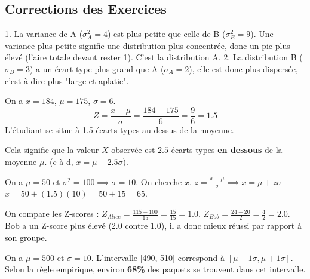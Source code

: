 
\subsection{Corrections des Exercices}

\begin{correctionbox}
1.  La variance de A ($\sigma_A^2=4$) est plus petite que celle de B ($\sigma_B^2=9$). Une variance plus petite signifie une distribution plus concentrée, donc un pic plus élevé (l'aire totale devant rester 1). C'est la distribution A.
2.  La distribution B ($\sigma_B=3$) a un écart-type plus grand que A ($\sigma_A=2$), elle est donc plus dispersée, c'est-à-dire plus "large et aplatie".
\end{correctionbox}

\begin{correctionbox}
On a $x=184$, $\mu=175$, $\sigma=6$.
$$Z = \frac{x - \mu}{\sigma} = \frac{184 - 175}{6} = \frac{9}{6} = 1.5$$
L'étudiant se situe à 1.5 écarts-types au-dessus de la moyenne.
\end{correctionbox}

\begin{correctionbox}
Cela signifie que la valeur $X$ observée est $2.5$ écarts-types \textbf{en dessous} de la moyenne $\mu$. (c-à-d, $x = \mu - 2.5\sigma$).
\end{correctionbox}

\begin{correctionbox}
On a $\mu=50$ et $\sigma^2=100 \implies \sigma=10$. On cherche $x$.
$z = \frac{x - \mu}{\sigma} \implies x = \mu + z\sigma$
$x = 50 + (1.5)(10) = 50 + 15 = 65$.
\end{correctionbox}

\begin{correctionbox}
On compare les Z-scores :
$Z_{Alice} = \frac{115 - 100}{15} = \frac{15}{15} = 1.0$.
$Z_{Bob} = \frac{24 - 20}{2} = \frac{4}{2} = 2.0$.
Bob a un Z-score plus élevé (2.0 contre 1.0), il a donc mieux réussi par rapport à son groupe.
\end{correctionbox}

\begin{correctionbox}
On a $\mu=500$ et $\sigma=10$. L'intervalle [490, 510] correspond à $[\mu - 1\sigma, \mu + 1\sigma]$.
Selon la règle empirique, environ \textbf{68\%} des paquets se trouvent dans cet intervalle.
\end{correctionbox}


